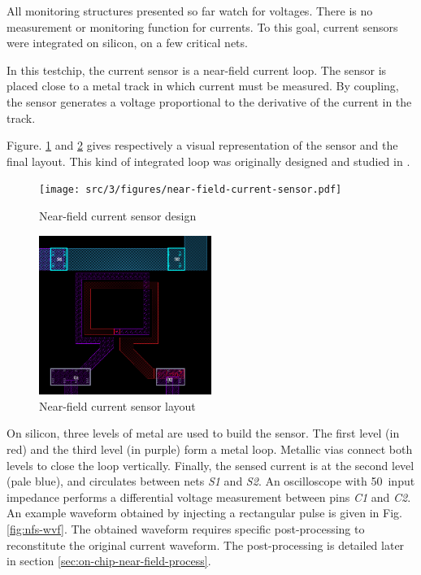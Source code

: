 All monitoring structures presented so far watch for voltages.
There is no measurement or monitoring function for currents.
To this goal, current sensors were integrated on silicon, on a few critical nets.

In this testchip, the current sensor is a near-field current loop.
The sensor is placed close to a metal track in which current must be measured.
By coupling, the sensor generates a voltage proportional to the derivative of the current in the track.

Figure. \ref{fig:near-field-current-sensor} and \ref{fig:near-field-current-sensor-layout} gives respectively a visual representation of the sensor and the final layout.
This kind of integrated loop was originally designed and studied in \cite{AlainSallesInductors}.

\begin{figure}[!h]
  \centering
  \texttt{[image: src/3/figures/near-field-current-sensor.pdf]}
  \caption{Near-field current sensor design}
  \label{fig:near-field-current-sensor}
\end{figure}

\begin{figure}[!h]
  \centering
  \includegraphics[width=0.5\textwidth]{src/3/figures/sensor_layout.png}
  \caption{Near-field current sensor layout}
  \label{fig:near-field-current-sensor-layout}
\end{figure}


On silicon, three levels of metal are used to build the sensor.
The first level (in red) and the third level (in purple) form a metal loop.
Metallic vias connect both levels to close the loop vertically.
Finally, the sensed current is at the second level (pale blue), and circulates between nets \textit{S1} and \textit{S2}.
An oscilloscope with 50\textOmega\ input impedance performs a differential voltage measurement between pins \textit{C1} and \textit{C2}.
An example waveform obtained by injecting a rectangular pulse is given in Fig. \ref{fig:nfs-wvf}.
The obtained waveform requires specific post-processing to reconstitute the original current waveform.
The post-processing is detailed later in section \ref{sec:on-chip-near-field-process}.

